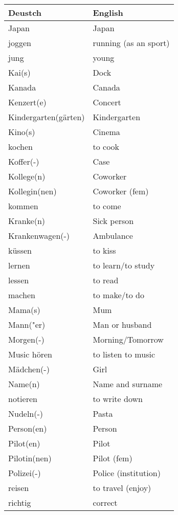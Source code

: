 \documentclass{article}
\renewcommand{\arraystretch}{1}
\begin{document}
\hfill
\begin{minipage}{0.48\textwidth}
    \centering
    \renewcommand{\arraystretch}{1.5}
    \begin{tabular}{|>{\raggedright\arraybackslash}p{3.5cm}|>{\raggedright\arraybackslash}p{3.5cm}|}
        \hline
        \rowcolor{gray!20} \textbf{Deustch} & \textbf{English} \\
        \hline
        Japan & Japan \\\hline
        joggen & running (as an sport) \\\hline
        jung & young \\\hline
        Kai(s) & Dock \\\hline
        Kanada & Canada \\\hline
        Kenzert(e) & Concert \\\hline
        Kindergarten(gärten) & Kindergarten \\\hline
        Kino(s) & Cinema \\\hline
        kochen & to cook \\\hline
        Koffer(-) & Case \\\hline
        Kollege(n) & Coworker \\\hline
        Kollegin(nen) & Coworker (fem) \\\hline
        kommen & to come \\\hline
        Kranke(n) & Sick person \\\hline
        Krankenwagen(-) & Ambulance \\\hline
        küssen & to kiss \\\hline
        lernen & to learn/to study \\\hline
        lessen & to read \\\hline
        machen & to make/to do \\\hline
        Mama(s) & Mum \\\hline
        Mann("er) & Man or husband \\\hline
        Morgen(-) & Morning/Tomorrow \\\hline
        Music hören & to listen to music \\\hline
        Mädchen(-) & Girl \\\hline
        Name(n) & Name and surname \\\hline
        notieren & to write down \\\hline
        Nudeln(-) & Pasta \\\hline
        Person(en) & Person \\\hline
        Pilot(en) & Pilot \\\hline
        Pilotin(nen) & Pilot (fem) \\\hline
        Polizei(-) & Police (institution) \\\hline
        reisen & to travel (enjoy) \\\hline
        richtig & correct \\\hline
    \end{tabular}
\end{minipage}
\end{document}
